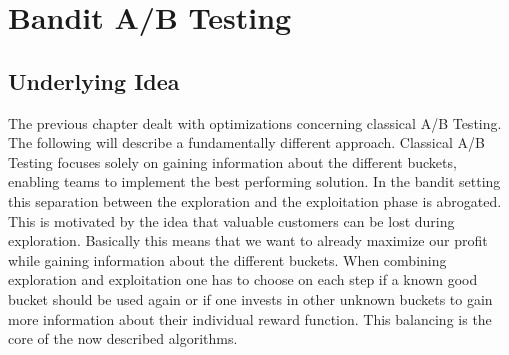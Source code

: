 \documentclass[main.tex]{subfiles}
\begin{document}
\chapter{Bandit A/B Testing}
\section{Underlying Idea}
The previous chapter dealt with optimizations concerning classical A/B Testing. The following will describe a fundamentally different approach. Classical A/B Testing focuses solely on gaining information about the different buckets, enabling teams to implement the best performing solution. In the bandit setting this separation between the exploration and the exploitation phase is abrogated. This is motivated by the idea that valuable customers can be lost during exploration. Basically this means that we want to already maximize our profit while gaining information about the different buckets. When combining exploration and exploitation one has to choose on each step if a known good bucket should be used again or if one invests in other unknown buckets to gain more information about their individual reward function. This balancing is the core of the now described algorithms.
\end{document}
